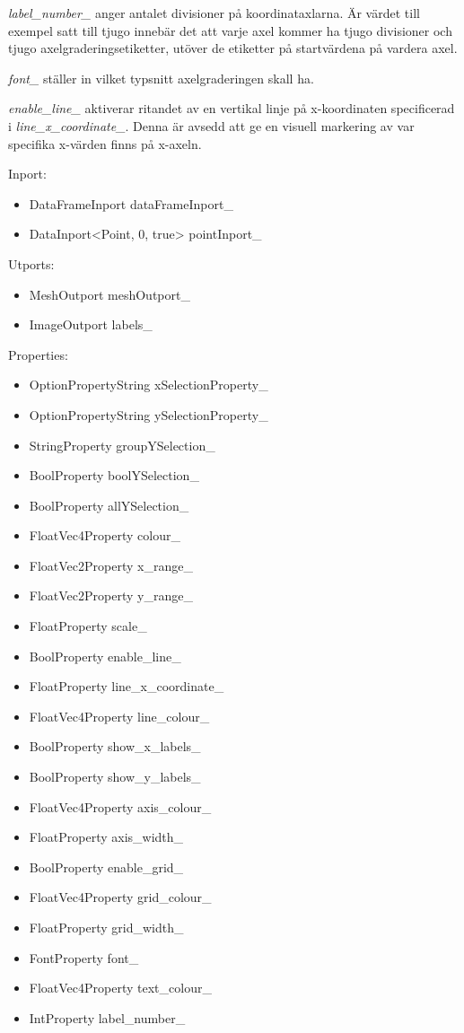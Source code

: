 \documentclass[10pt,oneside,swedish]{article}
\providecommand{\tightlist}{%
  \setlength{\itemsep}{0pt}\setlength{\parskip}{0pt}}
\begin{document}
\emph{label\_number\_} anger antalet divisioner på koordinataxlarna. Är
värdet till exempel satt till tjugo innebär det att varje axel kommer ha
tjugo divisioner och tjugo axelgraderingsetiketter, utöver de etiketter
på startvärdena på vardera axel.

\emph{font\_} ställer in vilket typsnitt axelgraderingen skall ha.

\emph{enable\_line\_} aktiverar ritandet av en vertikal linje på
x-koordinaten specificerad i \emph{line\_x\_coordinate\_}. Denna är
avsedd att ge en visuell markering av var specifika x-värden finns på
x-axeln.

Inport:

\begin{itemize}
\tightlist
\item
  DataFrameInport dataFrameInport\_
\item
  DataInport\textless{}Point, 0, true\textgreater{} pointInport\_
\end{itemize}

Utports:

\begin{itemize}
\tightlist
\item
  MeshOutport meshOutport\_
\item
  ImageOutport labels\_
\end{itemize}

Properties:

\begin{itemize}
\tightlist
\item
  OptionPropertyString xSelectionProperty\_
\item
  OptionPropertyString ySelectionProperty\_
\item
  StringProperty groupYSelection\_
\item
  BoolProperty boolYSelection\_
\item
  BoolProperty allYSelection\_
\item
  FloatVec4Property colour\_
\item
  FloatVec2Property x\_range\_
\item
  FloatVec2Property y\_range\_
\item
  FloatProperty scale\_
\item
  BoolProperty enable\_line\_
\item
  FloatProperty line\_x\_coordinate\_
\item
  FloatVec4Property line\_colour\_
\item
  BoolProperty show\_x\_labels\_
\item
  BoolProperty show\_y\_labels\_
\item
  FloatVec4Property axis\_colour\_
\item
  FloatProperty axis\_width\_
\item
  BoolProperty enable\_grid\_
\item
  FloatVec4Property grid\_colour\_
\item
  FloatProperty grid\_width\_
\item
  FontProperty font\_
\item
  FloatVec4Property text\_colour\_
\item
  IntProperty label\_number\_
\end{itemize}
\end{document}
